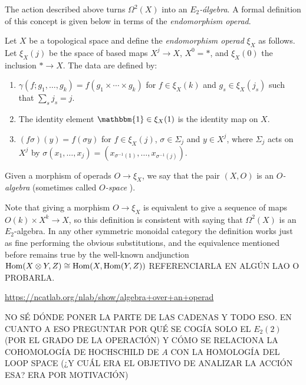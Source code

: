 \documentclass[TFM.tex]{subfiles}
\begin{document}
The action described above turns $\Omega^2(X)$ into an \emph{$E_2$-álgebra}. A formal definition of this concept is given below in terms of the \emph{endomorphism operad}.


\begin{defi}
Let $X$ be a topological space and define the \emph{endomorphism operad} $\xi_X$ as follows. Let $\xi_X(j)$ be the space of based maps $X^j\to X$, $X^0=*$, and $\xi_X(0)$ the inclusion $*\to X$. The data are defined by:
\begin{enumerate}
\item $\gamma(f;g_1,\dots, g_k)=f(g_1\times\cdots\times g_k)$ for $f\in \xi_X(k)$ and $g_s\in\xi_X(j_s)$ such that $\sum_s j_s=j$.
\item The identity element $\mathbbm{1}\in\xi_X(1)$ is the identity map on $X$.
\item $(f\sigma)(y)=f(\sigma y)$ for $f\in\xi_X(j)$, $\sigma\in\Sigma_j$ and $y\in X^j$, where $\Sigma_j$ acts on $X^j$ by $\sigma(x_1,\dots, x_j)=(x_{\sigma^{-1}(1)},\dots, x_{\sigma^{-1}(j)})$. 
\end{enumerate}

Given a morphism of operads $O\to \xi_X$, we say that the pair $(X,O)$ is an \emph{$O$-algebra} (sometimes called \emph{$O$-space} \cite{May}).
\end{defi}


Note that giving a morphism $O\to \xi_X$ is equivalent to give a sequence of maps $O(k)\times X^k\to X$, so this definition is consistent with saying that $\Omega^2(X)$ is an $E_2$-algebra. In any other symmetric monoidal category the definition works just as fine performing the obvious substitutions, and the equivalence mentioned before remains true by the well-known andjunction $\operatorname{Hom}(X\otimes Y,Z)\cong\operatorname{Hom}(X,\operatorname{Hom}(Y,Z))$ REFERENCIARLA EN ALGÚN LAO O PROBARLA. 

\url{https://ncatlab.org/nlab/show/algebra+over+an+operad}

NO SÉ DÓNDE PONER LA PARTE DE LAS CADENAS Y TODO ESO. EN CUANTO A ESO PREGUNTAR POR QUÉ SE COGÍA SOLO EL $E_2(2)$ (POR EL GRADO DE LA OPERACIÓN) Y CÓMO SE RELACIONA LA COHOMOLOGÍA DE HOCHSCHILD DE $A$ CON LA HOMOLOGÍA DEL LOOP SPACE (¿Y CUÁL ERA EL OBJETIVO DE ANALIZAR LA ACCIÓN ESA? ERA POR MOTIVACIÓN)

%
\end{document}
